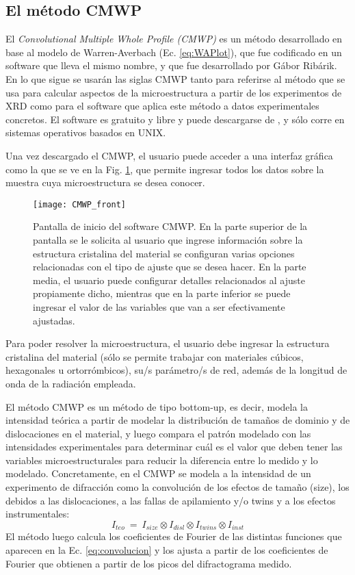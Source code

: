 \subsection{El método CMWP}\label{SS:CMWP}
El \textit{Convolutional Multiple Whole Profile (CMWP)} es un método desarrollado en base al modelo de Warren-Averbach (Ec. \ref{eq:WAPlot}), que fue codificado en un software que lleva el mismo nombre, y que fue desarrollado por Gábor Ribárik\cite{Ungar2001,Ribarik2001,Ribarik2008}. 
En lo que sigue se usarán las siglas CMWP tanto para referirse al método que se usa para calcular aspectos de la microestructura a partir de los experimentos de XRD como para el software que aplica este método a datos experimentales concretos.
El software es gratuito y libre y puede descargarse de \cite{cmwp:web}, y sólo corre en sistemas operativos basados en UNIX.

Una vez descargado el CMWP, el usuario puede acceder a una interfaz gráfica como la que se ve en la Fig. \ref{fig:CMWP_front}, que permite ingresar todos los datos sobre la muestra cuya microestructura se desea conocer.
\begin{figure}[!htb]
  \centering
  \texttt{[image: CMWP\_front]}
  \caption{Pantalla de inicio del software CMWP. En la parte superior de la pantalla se le solicita al usuario que ingrese información sobre la estructura cristalina del material se configuran varias opciones relacionadas con el tipo de ajuste que se desea hacer. En la parte media, el usuario puede configurar detalles relacionados al ajuste propiamente dicho, mientras que en la parte inferior se puede ingresar el valor de las variables que van a ser efectivamente ajustadas.}
  \label{fig:CMWP_front}
\end{figure}

Para poder resolver la microestructura, el usuario debe ingresar la estructura cristalina del material (sólo se permite trabajar con materiales cúbicos, hexagonales u ortorrómbicos), su/s parámetro/s de red, además de la longitud de onda de la radiación empleada.

El método CMWP es un método de tipo bottom-up, es decir, modela la intensidad teórica a partir de modelar la distribución de tamaños de dominio y de dislocaciones en el material, y luego compara el patrón modelado con las intensidades experimentales para determinar cuál es el valor que deben tener las variables microestructurales para reducir la diferencia entre lo medido y lo modelado.
Concretamente, en el CMWP se modela a la intensidad de un experimento de difracción como la convolución de los efectos de tamaño (size), los debidos a las dislocaciones, a las fallas de apilamiento y/o twins y a los efectos instrumentales:
\begin{equation}
  I_{teo} \ = \ I_{size} \otimes I_{disl} \otimes I_{twins} \otimes I_{inst}
  \label{eq:convolucion}
\end{equation}
\noindent
El método luego calcula los coeficientes de Fourier de las distintas funciones que aparecen en la Ec. \ref{eq:convolucion} y los ajusta a partir de los coeficientes de Fourier que obtienen a partir de los picos del difractograma medido.

